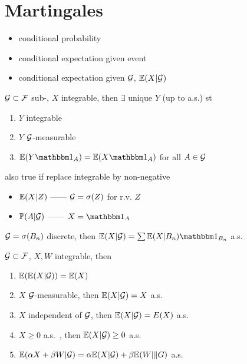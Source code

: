 \section{Martingales}\label{sec:martingales}

\begin{itemize}
    \item conditional probability
    \item conditional expectation given event
    \item conditional expectation given $\mathcal{G}$,  $\mathbb{E}(X|\mathcal{G})$
\end{itemize}

\begin{thm}
    $\mathcal{G} \subset \mathcal{F}$ sub-\sa, $X$ integrable, then $\exists$ unique $Y$ (up to a.s.) st
    \begin{enumerate}
        \item $Y$ integrable
        \item $Y$ $\mathcal{G}$-measurable
        \item $\Ex(Y\In_A) = \Ex(X\In_A)$ for all $A \in \mathcal{G}$
    \end{enumerate}
\end{thm}

\begin{fact}
    also true if replace integrable by non-negative
\end{fact}

\begin{itemize}
    \item $\mathbb{E}(X|Z)$ ------ $\mathcal{G} = \sigma(Z)$ for r.v. $Z$
    \item $\mathbb{P}(A|\mathcal{G})$ ------ $X = \In_A$
\end{itemize}

\begin{fact}
    $\mathcal{G} = \sigma(B_n)$ discrete, then $\Ex(X|\G) = \sum\Ex(X|B_n)\In_{B_n}$ a.s.\
\end{fact}

\begin{prop}
    $\mathcal{G} \subset \mathcal{F}$, $X, W$ integrable, then
    \begin{enumerate}
        \item $\mathbb{E}(\mathbb{E}(X|\mathcal{G})) = \mathbb{E}(X)$
        \item $X$ $\mathcal{G}$-measurable, then $\mathbb{E}(X|\mathcal{G}) = X$ a.s.
        \item $X$ independent of $\mathcal{G}$, then $\mathbb{E}(X|\mathcal{G}) = E(X)$ a.s.
        \item $X \geq 0$ a.s.\ , then $\mathbb{E}(X|\mathcal{G}) \geq 0$ a.s.
        \item $\mathbb{E}(\alpha X + \beta W|\mathcal{G}) = \alpha \mathbb{E}(X|\mathcal{G}) + \beta \mathbb{E}(W|\|G)$ a.s.
    \end{enumerate}
\end{prop}

